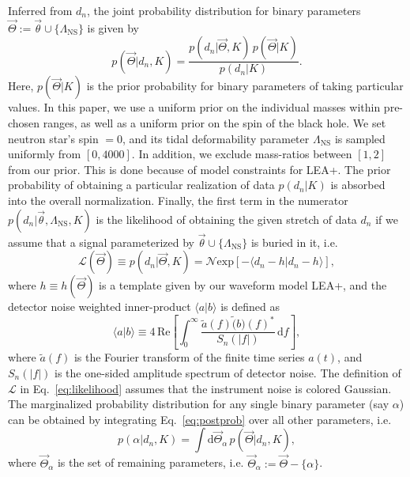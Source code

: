 \documentclass[aps,prd,amsmath,floats,floatfix, twocolumn,
superscriptaddress,nofootinbib,showpacs]{revtex4-1}
\newcommand{\D}{\mathrm{d}}
\newcommand{\lambdans}{\Lambda_\mathrm{NS}}
\newcommand{\LL}{\mathcal{L}}
\begin{document}
Inferred from $d_n$, the joint probability distribution for binary parameters
$\vec{\Theta}:=\vec{\theta}\cup\{\lambdans\}$ is given by
\begin{equation}\label{eq:postprob}
 p(\vec{\Theta} | d_n, K) = \dfrac{p(d_n|\vec{\Theta}, K)\,p(\vec{\Theta} | K)}{p(d_n|K)}.
\end{equation}
Here, $p(\vec{\Theta} | K)$ is the prior probability for binary parameters of
taking particular values. In this paper, we use a uniform prior on the
individual masses within pre-chosen ranges, as well as a uniform prior on the
spin of the black hole. We set neutron star's spin $=0$, and its tidal
deformability parameter $\lambdans$ is sampled uniformly from $[0, 4000]$. In
addition, we exclude mass-ratios between $[1,2]$ from our prior. This is done
because of model constraints for LEA+. The prior probability of obtaining a 
particular realization of data $p(d_n|K)$ is absorbed into the overall 
normalization. Finally, the first term in the numerator
$p(d_n|\vec{\theta}, \lambdans, K)$ is the likelihood of obtaining the given
stretch of data $d_n$ if we assume that a signal parameterized by
$\vec{\theta}\cup\{\lambdans\}$ is buried in it, i.e.
\begin{equation}\label{eq:likelihood}
 \LL(\vec{\Theta}) \equiv p(d_n| \vec{\Theta}, K) = \mathcal{N} \mathrm{exp}[- \langle d_n - h | d_n - h\rangle ],
\end{equation}
where $h\equiv h(\vec{\Theta})$ is a template given by our waveform model LEA+,
and the detector noise weighted inner-product $\langle a|b\rangle$ is defined 
as
\begin{equation}
\langle a|b\rangle \equiv 4\,\mathrm{Re}\left[\int_0^\infty \dfrac{\tilde{a}(f) \tilde(b)(f)^*}{S_n(|f|)}\,\D f\right],
\end{equation}
% 
where $\tilde{a}(f)$ is the Fourier transform of the finite time series $a(t)$,
and $S_n(|f|)$ is the one-sided amplitude spectrum of detector noise. The 
definition of $\LL$ in Eq.~\ref{eq:likelihood} assumes that the instrument
noise is colored Gaussian. The marginalized probability distribution for any
single binary parameter (say $\alpha$) can be obtained by integrating
Eq.~\ref{eq:postprob} over all other parameters, i.e. 
\begin{equation}
 p(\alpha | d_n, K) = \int\D \vec{\Theta}_\alpha\, p(\vec{\Theta} | d_n, K),
\end{equation}
where $\vec{\Theta}_\alpha$ is the set of remaining parameters, i.e.
$\vec{\Theta}_\alpha:=\vec{\Theta} - \{\alpha\}$.
\end{document}
